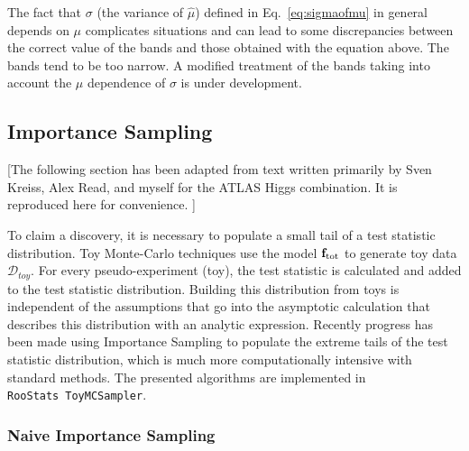 \documentclass{cernrep}
\def\roostats{\texttt{RooStats}}
\def\vec#1{\ifmmode
\mathchoice{\mbox{\boldmath$\displaystyle\bf#1$}}
{\mbox{\boldmath$\textstyle\bf#1$}}
{\mbox{\boldmath$\scriptstyle\bf#1$}}
{\mbox{\boldmath$\scriptscriptstyle\bf#1$}}\else
{\mbox{\boldmath$\bf#1$}}\fi}
\newcommand{\data}{{\ensuremath{\mathcal{D}}}}
\newcommand{\F}{{\ensuremath{\mathbf{f}}}}
\begin{document}
The fact that $\sigma$ (the variance of $\hat{\mu}$) defined in Eq.~\ref{eq:sigmaofmu} in general depends on $\mu$ complicates situations and can lead to some discrepancies between the correct value of the bands and those obtained with the equation above.  The bands tend to be too narrow.  A modified treatment of the bands taking into account the $\mu$ dependence of $\sigma$ is under development.






%
%
%

\subsection{Importance Sampling}

[The following section has been adapted from text written primarily by Sven Kreiss, Alex Read, and myself for the ATLAS Higgs combination.  It is reproduced here for convenience. ]

To claim a discovery, it is necessary to populate a small tail of a test statistic distribution. Toy Monte-Carlo techniques use the model $\F_{\rm tot}$ to generate toy data $\data_{toy}$. For every pseudo-experiment (toy), the test statistic is calculated and added to the test statistic distribution. Building this distribution from toys is independent of the assumptions that go into the asymptotic calculation that describes this distribution with an analytic expression.   Recently progress has been made using Importance Sampling to populate the extreme tails of the test statistic distribution, which is much more computationally intensive with standard methods. The presented algorithms are implemented in \roostats\ \texttt{ToyMCSampler}.


\subsubsection{Naive Importance Sampling}

\end{document}
